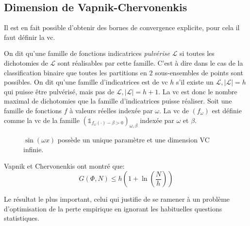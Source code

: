 \subsection{Dimension de Vapnik-Chervonenkis}

Il est en fait possible d'obtenir des bornes de convergence explicite, pour cela il faut définir la \ac{vc}.

\begin{definition}
    On dit qu'une famille de fonctions indicatrices \emph{pulvérise} $\mathcal{L}$ si toutes les dichotomies de $\mathcal{L}$ sont réalisables par cette famille. C'est à dire dans le cas de la classification binaire que toutes les partitions en $2$ sous-ensembles de points sont possibles.
    On dit qu'une famille d'indicatrices est de \ac{vc} $h$ s’il existe un $\mathcal{L}, \vert \mathcal{L} \vert = h$ qui puisse être pulvérisé, mais pas de $\mathcal{L}, \vert \mathcal{L} \vert = h+1$. La \ac{vc} est donc le nombre maximal de dichotomies que la famille d'indicatrices puisse réaliser.
    Soit une famille de fonctions $f$ à valeurs réelles indexée par $\omega$. La \ac{vc} de $(f_\omega)$ est définie comme la \ac{vc} de la famille $\left(\mathds{1}_{ f_\omega (\cdot) - \beta > 0}\right)_{\omega,\beta}$ indexée par $\omega$ et $\beta$.
\end{definition}

\begin{figure}
    \centering
    \caption{$\sin ( \omega x)$ possède un unique paramètre et une dimension VC infinie.}
\end{figure}

Vapnik et Chervonenkis ont montré que:
\begin{equation*}
    G(\Phi,N) \leq h \left( 1 + \ln \left( \frac{N}{h} \right) \right)
\end{equation*}

Le résultat le plus important, celui qui justifie de se ramener à un problème d'optimisation de la perte empirique en ignorant les habituelles questions statistiques.

